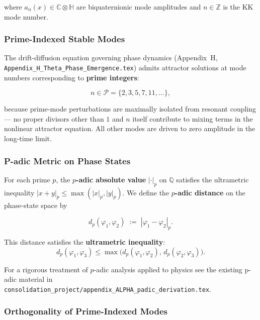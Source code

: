 where $a_n(x) \in \mathbb{C}\otimes\mathbb{H}$ are biquaternionic mode amplitudes and $n \in \mathbb{Z}$
is the KK mode number.

\subsubsection{Prime-Indexed Stable Modes}

The drift-diffusion equation governing phase dynamics (Appendix~H,
\texttt{Appendix\_H\_Theta\_Phase\_Emergence.tex}) admits attractor solutions at mode numbers
corresponding to \textbf{prime integers}:

\begin{equation}
n \in \mathcal{P} = \{2, 3, 5, 7, 11, \ldots\},
\end{equation}

because prime-mode perturbations are maximally isolated from resonant coupling — no proper
divisors other than $1$ and $n$ itself contribute to mixing terms in the nonlinear attractor equation.
All other modes are driven to zero amplitude in the long-time limit.

\subsubsection{P-adic Metric on Phase States}

For each prime $p$, the \textbf{$p$-adic absolute value} $|\cdot|_p$ on $\mathbb{Q}$ satisfies the
ultrametric inequality $|x + y|_p \leq \max(|x|_p, |y|_p)$.  We define the
\textbf{$p$-adic distance} on the phase-state space by

\begin{equation}
\label{eq:padic_distance}
d_p(\varphi_1, \varphi_2) \;:=\; |\varphi_1 - \varphi_2|_p.
\end{equation}

This distance satisfies the \textbf{ultrametric inequality}:
\begin{equation}
d_p(\varphi_1, \varphi_3) \leq \max\!\bigl(d_p(\varphi_1, \varphi_2),\, d_p(\varphi_2, \varphi_3)\bigr).
\end{equation}

For a rigorous treatment of $p$-adic analysis applied to physics see the existing p-adic
material in \texttt{consolidation\_project/appendix\_ALPHA\_padic\_derivation.tex}.

\subsubsection{Orthogonality of Prime-Indexed Modes}

